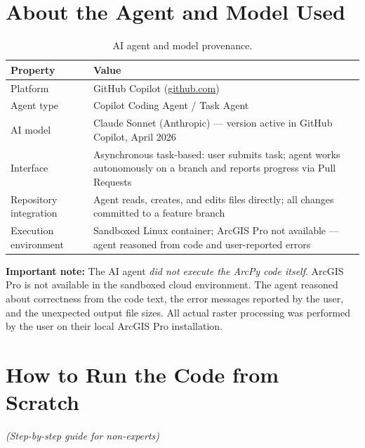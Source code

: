 \documentclass[11pt, a4paper]{article}
\begin{document}
\section{About the Agent and Model Used}

\begin{table}[h]
\centering
\caption{AI agent and model provenance.}
\begin{tabularx}{\linewidth}{L{4cm}X}
\toprule
\textbf{Property} & \textbf{Value} \\
\midrule
Platform        & GitHub Copilot (\href{https://github.com}{github.com}) \\
Agent type      & Copilot Coding Agent / Task Agent \\
AI model        & Claude Sonnet (Anthropic) — version active in GitHub Copilot, April 2026 \\
Interface       & Asynchronous task-based: user submits task; agent works autonomously on a branch and reports progress via Pull Requests \\
Repository integration & Agent reads, creates, and edits files directly; all changes committed to a feature branch \\
Execution environment & Sandboxed Linux container; ArcGIS Pro not available — agent reasoned from code and user-reported errors \\
\bottomrule
\end{tabularx}
\end{table}

\textbf{Important note:} The AI agent \textit{did not execute the ArcPy code
itself}.  ArcGIS Pro is not available in the sandboxed cloud environment.
The agent reasoned about correctness from the code text, the error messages
reported by the user, and the unexpected output file sizes.  All actual raster
processing was performed by the user on their local ArcGIS Pro installation.

\section{How to Run the Code from Scratch}
\textit{(Step-by-step guide for non-experts)}
\end{document}
